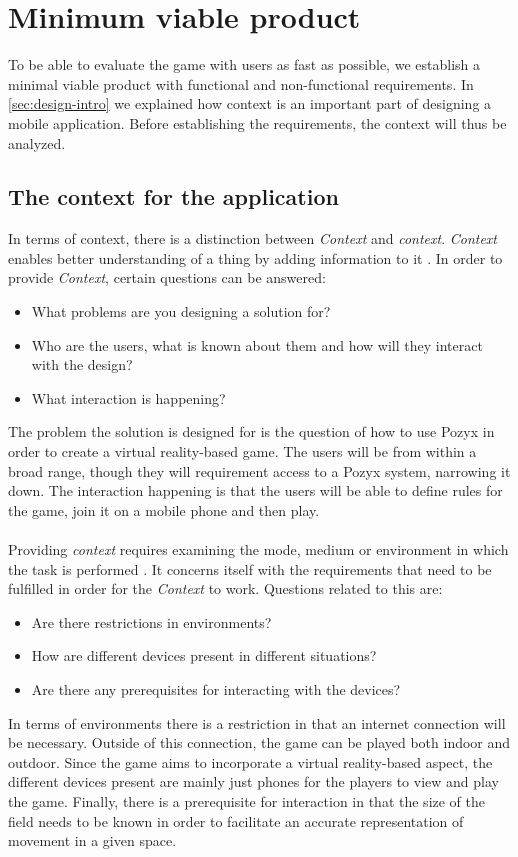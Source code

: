 \section{Minimum viable product}\label{sec:mvp}
To be able to evaluate the game with users as fast as possible, we establish a minimal viable product with functional and non-functional requirements.
In \autoref{sec:design-intro} we explained how context is an important part of designing a mobile application.
Before establishing the requirements, the context will thus be analyzed.

\subsection{The context for the application}\label{subsec:context}
In terms of context, there is a distinction between \textit{Context} and \textit{context}.
\textit{Context} enables better understanding of a thing by adding information to it \cite{MobileDesign}.
In order to provide \textit{Context}, certain questions can be answered:
\begin{itemize}
    \item What problems are you designing a solution for?
    \item Who are the users, what is known about them and how will they interact with the design?
    \item What interaction is happening?
\end{itemize}
The problem the solution is designed for is the question of how to use Pozyx in order to create a virtual reality-based game.
The users will be from within a broad range, though they will requirement access to a Pozyx system, narrowing it down.
The interaction happening is that the users will be able to define rules for the game, join it on a mobile phone and then play.
\\\\
Providing \textit{context} requires examining the mode, medium or environment in which the task is performed \cite{MobileDesign}.
It concerns itself with the requirements that need to be fulfilled in order for the \textit{Context} to work.
Questions related to this are:
\begin{itemize}
    \item Are there restrictions in environments?
    \item How are different devices present in different situations?
    \item Are there any prerequisites for interacting with the devices?
\end{itemize}
In terms of environments there is a restriction in that an internet connection will be necessary.
Outside of this connection, the game can be played both indoor and outdoor.
Since the game aims to incorporate a virtual reality-based aspect, the different devices present are mainly just phones for the players to view and play the game.
Finally, there is a prerequisite for interaction in that the size of the field needs to be known in order to facilitate an accurate representation of movement in a given space.



